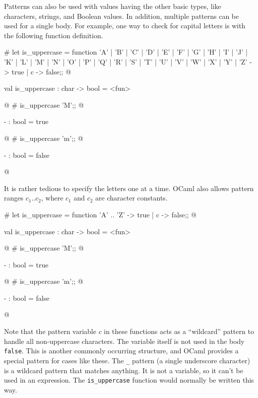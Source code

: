 
Patterns can also be used with values having the other basic types,
like characters, strings, and Boolean values.  In addition, multiple
patterns can be used for a single body.  For example, one way to check
for capital letters is with the following function definition.

\begin{ocaml}
# let is_uppercase = function
   'A' | 'B' | 'C' | 'D' | 'E' | 'F' | 'G' | 'H'
 | 'I' | 'J' | 'K' | 'L' | 'M' | 'N' | 'O' | 'P'
 | 'Q' | 'R' | 'S' | 'T' | 'U' | 'V' | 'W' | 'X'
 | 'Y' | 'Z' ->
    true
 | c ->
    false;;
@
\begin{topoutput}
val is_uppercase : char -> bool = <fun>
\end{topoutput}
@
# is_uppercase 'M';;
@
\begin{topoutput}
- : bool = true
\end{topoutput}
@
# is_uppercase 'm';;
@
\begin{topoutput}
- : bool = false
\end{topoutput}
@
\end{ocaml}
%
It is rather tedious to specify the letters one at a time.
OCaml also allows pattern ranges $c_1 .. c_2$,
where $c_1$ and $c_2$ are character constants.

\begin{ocaml}
# let is_uppercase = function
     'A' .. 'Z' -> true
   | c -> false;;
@
\begin{topoutput}
val is_uppercase : char -> bool = <fun>
\end{topoutput}
@
# is_uppercase 'M';;
@
\begin{topoutput}
- : bool = true
\end{topoutput}
@
# is_uppercase 'm';;
@
\begin{topoutput}
- : bool = false
\end{topoutput}
@
\end{ocaml}
%
\label{patterns:wildcard}
Note that the pattern variable $c$ in these functions acts as a
``wildcard'' pattern to handle all non-uppercase characters.  The
variable itself is not used in the body \hbox{\lstinline/false/}.  This is another
commonly occurring structure, and OCaml provides a special pattern for
cases like these.  The \hbox{\lstinline/_/} pattern (a single underscore character)
is a wildcard pattern that matches anything.  It is not a variable, so
it can't be used in an expression.  The \hbox{\lstinline/is_uppercase/} function
would normally be written this way.

